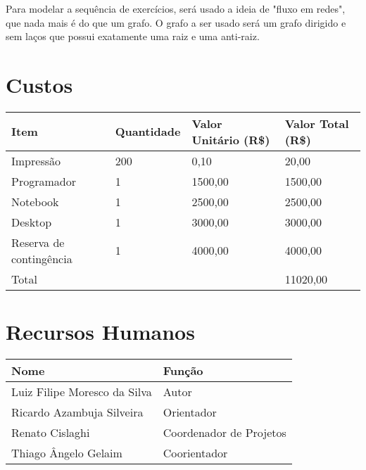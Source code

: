 \documentclass[12pt]{article}
\begin{document}
        Para modelar a sequência de exercícios, será usado a ideia de "fluxo em redes", que nada
        mais é do que um grafo. O grafo a ser usado será um grafo dirigido e sem laços que possui
        exatamente uma raiz e uma anti-raiz.

\newpage
\section{Custos}
    \begin{tabular}{l l l l}
        \hline
        Item                    &   Quantidade  &   Valor Unitário (R\$)    &   Valor Total (R\$) \\
        \hline
        Impressão               &   200         &   0,10                    &   20,00             \\

        Programador             &   1           &   1500,00                 &   1500,00           \\
        Notebook                &   1           &   2500,00                 &   2500,00           \\
        Desktop                 &   1           &   3000,00                 &   3000,00           \\
        Reserva de contingência &   1           &   4000,00                 &   4000,00           \\
        \hline
        Total                   &               &                           &   11020,00
    \end{tabular}

\newpage
\section{Recursos Humanos}
    \begin{tabular}{l l}
        \hline
        Nome                            & Função                  \\
        \hline
        Luiz Filipe Moresco da Silva    & Autor                   \\
        Ricardo Azambuja Silveira       & Orientador              \\
        Renato Cislaghi                 & Coordenador de Projetos \\
        Thiago Ângelo Gelaim            & Coorientador            \\
        \hline
    \end{tabular}
    \\
    \\
\end{document}
